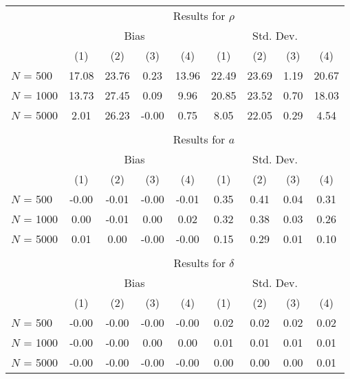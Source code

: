 \begin{tabular}{lcccccccc} \\\toprule
 & \multicolumn{8}{c}{Results for $\rho$} \\ 
 & \multicolumn{4}{c}{Bias} & \multicolumn{4}{c}{Std. Dev.} \\ 
& (1)& (2)& (3)& (4)& (1)& (2)& (3)& (4)\\ 
\cmidrule(r){2-5}\cmidrule(r){6-9}$N$ = 500 & 17.08 & 23.76 & 0.23 & 13.96 & 22.49 & 23.69 & 1.19 & 20.67\\ 
$N$ = 1000 & 13.73 & 27.45 & 0.09 & 9.96 & 20.85 & 23.52 & 0.70 & 18.03\\ 
$N$ = 5000 & 2.01 & 26.23 & -0.00 & 0.75 & 8.05 & 22.05 & 0.29 & 4.54\\ 
&&&&&&&& \\ 
 & \multicolumn{8}{c}{Results for $a$} \\ 
 & \multicolumn{4}{c}{Bias} & \multicolumn{4}{c}{Std. Dev.} \\ 
& (1)& (2)& (3)& (4)& (1)& (2)& (3)& (4)\\ 
\cmidrule(r){2-5}\cmidrule(r){6-9}$N$ = 500 & -0.00 & -0.01 & -0.00 & -0.01 & 0.35 & 0.41 & 0.04 & 0.31\\ 
$N$ = 1000 & 0.00 & -0.01 & 0.00 & 0.02 & 0.32 & 0.38 & 0.03 & 0.26\\ 
$N$ = 5000 & 0.01 & 0.00 & -0.00 & -0.00 & 0.15 & 0.29 & 0.01 & 0.10\\ 
&&&&&&&& \\ 
 & \multicolumn{8}{c}{Results for $\delta$} \\ 
 & \multicolumn{4}{c}{Bias} & \multicolumn{4}{c}{Std. Dev.} \\ 
& (1)& (2)& (3)& (4)& (1)& (2)& (3)& (4)\\ 
\cmidrule(r){2-5}\cmidrule(r){6-9}$N$ = 500 & -0.00 & -0.00 & -0.00 & -0.00 & 0.02 & 0.02 & 0.02 & 0.02\\ 
$N$ = 1000 & -0.00 & -0.00 & 0.00 & 0.00 & 0.01 & 0.01 & 0.01 & 0.01\\ 
$N$ = 5000 & -0.00 & -0.00 & -0.00 & -0.00 & 0.00 & 0.00 & 0.00 & 0.01\\ 
\bottomrule\end{tabular}